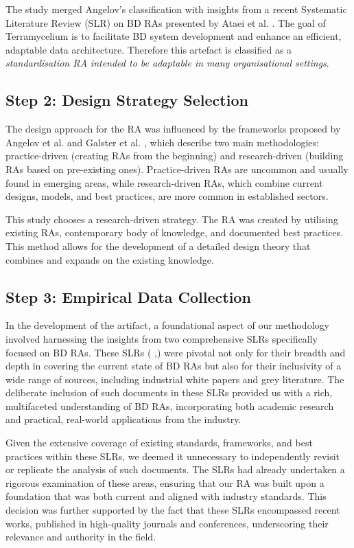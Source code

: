\documentclass[journal]{IEEEtran}
\begin{document}
The study merged Angelov's classification with insights from a recent Systematic Literature Review (SLR) on BD RAs presented by Ataei et al. \cite{ataei2022state}. The goal of Terramycelium is to facilitate BD system development and enhance an efficient, adaptable data architecture. Therefore this artefact is classified as a \emph{standardisation RA intended to be adaptable in many organisational settings}.


\subsection{Step 2: Design Strategy Selection}

The design approach for the RA was influenced by the frameworks proposed by Angelov et al. \cite{angelov2012framework} and Galster et al. \cite{GALSTER2011Empirically}, which describe two main methodologies: practice-driven (creating RAs from the beginning) and research-driven (building RAs based on pre-existing ones). Practice-driven RAs are uncommon and usually found in emerging areas, while research-driven RAs, which combine current designs, models, and best practices, are more common in established sectors.

This study chooses a research-driven strategy. The RA was created by utilising existing RAs, contemporary body of knowledge, and documented best practices. This method allows for the development of a detailed design theory that combines and expands on the existing knowledge.

\subsection{Step 3: Empirical Data Collection} \label{theSLR}

In the development of the artifact, a foundational aspect of our methodology involved harnessing the insights from two comprehensive SLRs specifically focused on BD RAs. These SLRs (\cite{ataei2022state} ,\cite{AtaeiACIS}) were pivotal not only for their breadth and depth in covering the current state of BD RAs but also for their inclusivity of a wide range of sources, including industrial white papers and grey literature. The deliberate inclusion of such documents in these SLRs provided us with a rich, multifaceted understanding of BD RAs, incorporating both academic research and practical, real-world applications from the industry.

Given the extensive coverage of existing standards, frameworks, and best practices within these SLRs, we deemed it unnecessary to independently revisit or replicate the analysis of such documents. The SLRs had already undertaken a rigorous examination of these areas, ensuring that our RA was built upon a foundation that was both current and aligned with industry standards. This decision was further supported by the fact that these SLRs encompassed recent works, published in high-quality journals and conferences, underscoring their relevance and authority in the field.
\end{document}
